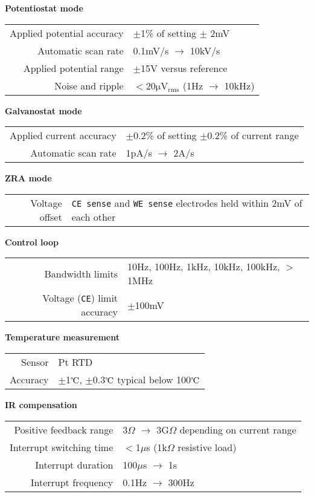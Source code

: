 \noindent \textbf{Potentiostat mode}
\medskip \\ \medskip
\begin{tabular}{R}
    Applied potential accuracy  &  $\pm$1\% of setting $\pm$ 2mV \\
    Automatic scan rate         & 0.1mV/s $\rightarrow$ 10kV/s\\
    Applied potential range     & $\pm$15V versus reference \\
    Noise and ripple            & $<20\mathrm{\mu V_{rms}}$ (1Hz $\rightarrow$ 10kHz) \\
\end{tabular}

\noindent \textbf{Galvanostat mode}
\medskip \\ \medskip
\begin{tabular}{R}
    Applied current accuracy  &  $\pm$0.2\% of setting $\pm$0.2\% of current range\\
    Automatic scan rate      & 1pA/s $\rightarrow$ 2A/s\\
\end{tabular}
    
\noindent \textbf{ZRA mode}
\medskip \\ \medskip
\begin{tabular}{R}
    Voltage offset & \texttt{CE sense} and \texttt{WE sense} electrodes held within 2mV of each other\\
\end{tabular}

\noindent \textbf{Control loop}
\medskip \\ \bigskip
\begin{tabular}{R}
    Bandwidth limits    & 10Hz, 100Hz, 1kHz, 10kHz, 100kHz, $>$1MHz\\
    Voltage (\texttt{CE}) limit accuracy &$\pm$100mV\\
\end{tabular}

\noindent \textbf{Temperature measurement}
\medskip \\ \medskip
\begin{tabular}{R}
    Sensor      &Pt RTD\\
    Accuracy    &$\pm$1$\celsius$, $\pm$0.3$\celsius$ typical below 100$\celsius$ \\
\end{tabular}

\pagebreak

\noindent \textbf{IR compensation}
\medskip \\ \bigskip
\begin{tabular}{R}
    Positive feedback range &3$\Omega$ $\rightarrow$ 3G$\Omega$ depending on current range\\
    Interrupt switching time & $<$1$\mu$s (1k$\Omega$ resistive load)\\
    Interrupt duration & 100$\mu$s $\rightarrow$ 1s\\
    Interrupt frequency & 0.1Hz $\rightarrow$ 300Hz\\
\end{tabular}

